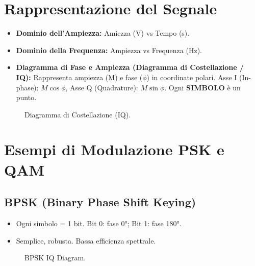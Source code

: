 \section{Rappresentazione del Segnale}
\begin{itemize}
    \item \textbf{Dominio dell'Ampiezza:} Amiezza (V) vs Tempo (s).
    \item \textbf{Dominio della Frequenza:} Ampiezza vs Frequenza (Hz).
    \item \textbf{Diagramma di Fase e Ampiezza (Diagramma di Costellazione / IQ):}
    Rappresenta ampiezza (M) e fase ($\phi$) in coordinate polari. Asse I (In-phase): $M \cos \phi$, Asse Q (Quadrature): $M \sin \phi$. Ogni \textbf{SIMBOLO} è un punto.
\end{itemize}
\begin{figure}[H]
\centering
{}
\caption{Diagramma di Costellazione (IQ).}
\label{fig:iq_diagram}
\end{figure}

\section{Esempi di Modulazione PSK e QAM}
\subsection{BPSK (Binary Phase Shift Keying)}
\begin{itemize}
    \item Ogni simbolo = 1 bit. Bit 0: fase 0°; Bit 1: fase 180°.
    \item Semplice, robusta. Bassa efficienza spettrale.
\end{itemize}
\begin{figure}[H] \centering
{} \caption{BPSK IQ Diagram.} \end{figure}

